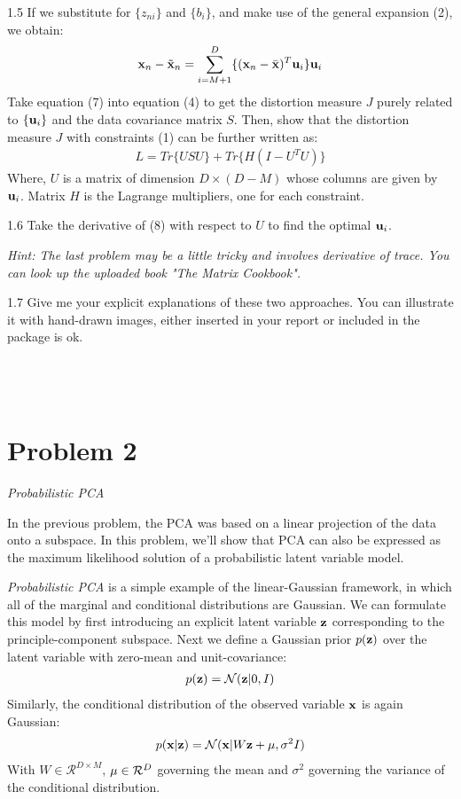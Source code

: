 \documentclass{article}
\theoremstyle{definition}
\theoremstyle{definition}
\theoremstyle{remark}
\begin{document}
1.5 If we substitute for $\{z_{ni}\}$ and $\{b_{i}\}$, and make use of the general expansion (2), we obtain:
\begin{eqnarray}
\bold{x}_{n}-\tilde{\bold{x}}_{n}=\sum_{i=M+1}^{D}\{(\bold{x}_{n}-\bar{\bold{x}})^{T}\bold{u}_{i}\}\bold{u}_{i}
\end{eqnarray}
Take equation (7) into equation (4) to get the distortion measure $J$ purely related to $\{\bold{u}_{i}\}$ and the data covariance matrix $S$. Then, show that the distortion measure $J$ with constraints (1) can be further written as:
\begin{eqnarray}
L=Tr\{USU\}+Tr\{H(I-U^{T}U)\}
\end{eqnarray}
Where, $U$ is a matrix of dimension $D\times (D-M)$ whose columns are given by $\bold{u}_{i}$. Matrix $H$ is the Lagrange multipliers, one for each constraint.

1.6 Take the derivative of (8) with respect to $U$ to find the optimal $\bold{u}_{i}$.

\emph{Hint: The last problem may be a little tricky and involves derivative of trace. You can look up the uploaded book "The Matrix Cookbook".}

1.7 Give me your explicit explanations of these two approaches. You can illustrate it with hand-drawn images, either inserted in your report or included in the package is ok.
\\
\\
\\
\\
\section*{Problem 2}\label{problem:2}
\emph{Probabilistic PCA}

In the previous problem, the PCA was based on a linear projection of the data onto a subspace. In this problem, we'll show that PCA can also be expressed as the maximum likelihood solution of a probabilistic latent variable model.

\emph{Probabilistic PCA} is a simple example of the linear-Gaussian framework, in which all of the marginal and conditional distributions are Gaussian. We can formulate this model by first introducing an explicit latent variable $\bold{z}$ corresponding to the principle-component subspace. Next we define a Gaussian prior $p(\bold{z})$ over the latent variable with zero-mean and unit-covariance:
\begin{eqnarray}
p(\bold{z})=\mathcal{N}(\bold{z}|0, I)
\end{eqnarray}
Similarly, the conditional distribution of the observed variable $\bold{x}$ is again Gaussian:
\begin{eqnarray}
p(\bold{x}|\bold{z})=\mathcal{N}(\bold{x}|W\bold{z}+\bold{\mu},\sigma^{2}I)
\end{eqnarray}
With $W\in \mathcal{R}^{D\times M}$, $\bold{\mu}\in \mathcal{R}^{D}$ governing the mean and $\sigma^{2}$ governing the variance of the conditional distribution.
\end{document}
